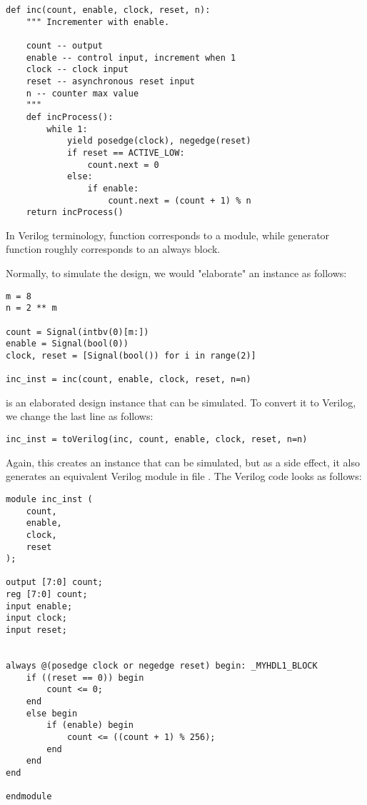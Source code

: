 \begin{verbatim}
def inc(count, enable, clock, reset, n):
    """ Incrementer with enable.
    
    count -- output
    enable -- control input, increment when 1
    clock -- clock input
    reset -- asynchronous reset input
    n -- counter max value
    """
    def incProcess():
        while 1:
            yield posedge(clock), negedge(reset)
            if reset == ACTIVE_LOW:
                count.next = 0
            else:
                if enable:
                    count.next = (count + 1) % n
    return incProcess()
\end{verbatim}

In Verilog terminology, function  corresponds to a
module, while generator function 
roughly corresponds to an always block.

Normally, to simulate the design, we would "elaborate" an instance
as follows:

\begin{verbatim}
m = 8
n = 2 ** m
 
count = Signal(intbv(0)[m:])
enable = Signal(bool(0))
clock, reset = [Signal(bool()) for i in range(2)]

inc_inst = inc(count, enable, clock, reset, n=n)
\end{verbatim}

 is an elaborated design instance that can be simulated. To
convert it to Verilog, we change the last line as follows:

\begin{verbatim}
inc_inst = toVerilog(inc, count, enable, clock, reset, n=n)
\end{verbatim}

Again, this creates an instance that can be simulated, but as a side
effect, it also generates an equivalent Verilog module in file .
The Verilog code looks as follows:

\begin{verbatim}
module inc_inst (
    count,
    enable,
    clock,
    reset
);

output [7:0] count;
reg [7:0] count;
input enable;
input clock;
input reset;


always @(posedge clock or negedge reset) begin: _MYHDL1_BLOCK
    if ((reset == 0)) begin
        count <= 0;
    end
    else begin
        if (enable) begin
            count <= ((count + 1) % 256);
        end
    end
end

endmodule
\end{verbatim}

